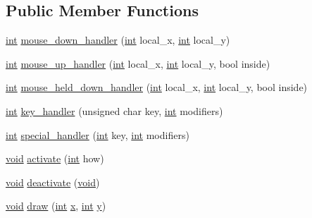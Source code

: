 \subsection*{Public Member Functions}
\begin{DoxyCompactItemize}
\item 
\hyperlink{wglext_8h_a500a82aecba06f4550f6849b8099ca21}{int} \hyperlink{class_g_l_u_i___edit_text_a096021e2d0b258ffee0b36988850677b}{mouse\+\_\+down\+\_\+handler} (\hyperlink{wglext_8h_a500a82aecba06f4550f6849b8099ca21}{int} local\+\_\+x, \hyperlink{wglext_8h_a500a82aecba06f4550f6849b8099ca21}{int} local\+\_\+y)
\item 
\hyperlink{wglext_8h_a500a82aecba06f4550f6849b8099ca21}{int} \hyperlink{class_g_l_u_i___edit_text_ac05967e2a8826e2bf796c65758da47ea}{mouse\+\_\+up\+\_\+handler} (\hyperlink{wglext_8h_a500a82aecba06f4550f6849b8099ca21}{int} local\+\_\+x, \hyperlink{wglext_8h_a500a82aecba06f4550f6849b8099ca21}{int} local\+\_\+y, bool inside)
\item 
\hyperlink{wglext_8h_a500a82aecba06f4550f6849b8099ca21}{int} \hyperlink{class_g_l_u_i___edit_text_af98242599d889464f6b8dfb3aa23f6b4}{mouse\+\_\+held\+\_\+down\+\_\+handler} (\hyperlink{wglext_8h_a500a82aecba06f4550f6849b8099ca21}{int} local\+\_\+x, \hyperlink{wglext_8h_a500a82aecba06f4550f6849b8099ca21}{int} local\+\_\+y, bool inside)
\item 
\hyperlink{wglext_8h_a500a82aecba06f4550f6849b8099ca21}{int} \hyperlink{class_g_l_u_i___edit_text_a92fcd78877375cb2bba3b5e9f88635b6}{key\+\_\+handler} (unsigned char key, \hyperlink{wglext_8h_a500a82aecba06f4550f6849b8099ca21}{int} modifiers)
\item 
\hyperlink{wglext_8h_a500a82aecba06f4550f6849b8099ca21}{int} \hyperlink{class_g_l_u_i___edit_text_a81478f6a0a9ba0c2dc715e0b3730077e}{special\+\_\+handler} (\hyperlink{wglext_8h_a500a82aecba06f4550f6849b8099ca21}{int} key, \hyperlink{wglext_8h_a500a82aecba06f4550f6849b8099ca21}{int} modifiers)
\item 
\hyperlink{wglext_8h_a9e6b7f1933461ef318bb000d6bd13b83}{void} \hyperlink{class_g_l_u_i___edit_text_a071ddcac9844e7d0bed23a7c0dabadd1}{activate} (\hyperlink{wglext_8h_a500a82aecba06f4550f6849b8099ca21}{int} how)
\item 
\hyperlink{wglext_8h_a9e6b7f1933461ef318bb000d6bd13b83}{void} \hyperlink{class_g_l_u_i___edit_text_a4a83b7bc0b6d60e4fa0dd797b49255ab}{deactivate} (\hyperlink{wglext_8h_a9e6b7f1933461ef318bb000d6bd13b83}{void})
\item 
\hyperlink{wglext_8h_a9e6b7f1933461ef318bb000d6bd13b83}{void} \hyperlink{class_g_l_u_i___edit_text_af5027cba2aeff900776ea1cbea37fdd8}{draw} (\hyperlink{wglext_8h_a500a82aecba06f4550f6849b8099ca21}{int} \hyperlink{glext_8h_ad77deca22f617d3f0e0eb786445689fc}{x}, \hyperlink{wglext_8h_a500a82aecba06f4550f6849b8099ca21}{int} \hyperlink{glext_8h_a9298c7ad619074f5285b32c6b72bfdea}{y})

\end{DoxyCompactItemize}
